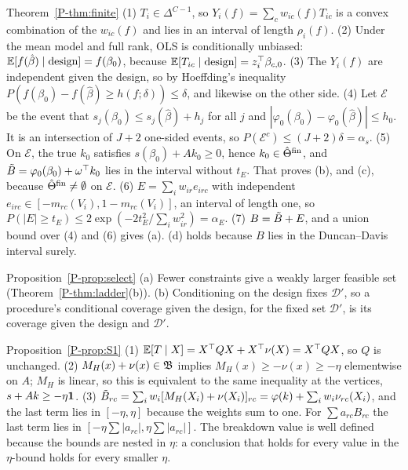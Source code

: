 \begin{proofof}{Theorem~\ref{P-thm:finite}}
(1) $T_i\in\Delta^{C-1}$, so $Y_i(f)=\sum_cw_{ic}(f)T_{ic}$ is a convex combination of the
$w_{ic}(f)$ and lies in an interval of length $\rho_i(f)$.
(2) Under the mean model and full rank, OLS is conditionally unbiased:
$\mathbb E[f(\hat\beta)\mid\text{design}]=f(\beta_0)$, because $\mathbb E[T_{ic}\mid\text{design}]=z_i^\top\beta_{c,0}$.
(3) The $Y_i(f)$ are independent given the design, so by Hoeffding's inequality
$P(f(\beta_0)-f(\hat\beta)\ge h(f;\delta))\le\delta$, and likewise on the other side.
(4) Let $\mathcal E$ be the event that $s_j(\beta_0)\le s_j(\hat\beta)+h_j$ for all $j$ and
$|\varphi_0(\beta_0)-\varphi_0(\hat\beta)|\le h_0$. It is an intersection of $J+2$ one-sided
events, so $P(\mathcal E^c)\le(J+2)\delta=\alpha_s$.
(5) On $\mathcal E$, the true $k_0$ satisfies $s(\beta_0)+Ak_0\ge0$, hence
$k_0\in\hat\Theta^{\rm fin}$, and $\tilde B=\varphi_0(\beta_0)+\omega^\top k_0$ lies in the interval
without $t_E$. That proves (b), and (c), because $\hat\Theta^{\rm fin}\ne\emptyset$ on
$\mathcal E$.
(6) $E=\sum_iw_{ir}e_{irc}$ with independent $e_{irc}\in[-m_{rc}(V_i),1-m_{rc}(V_i)]$, an
interval of length one, so $P(|E|\ge t_E)\le2\exp(-2t_E^2/\sum_iw_{ir}^2)=\alpha_E$.
(7) $B=\tilde B+E$, and a union bound over (4) and (6) gives (a). (d) holds because $B$ lies
in the Duncan--Davis interval surely.
\end{proofof}

\begin{proofof}{Proposition~\ref{P-prop:select}}
(a) Fewer constraints give a weakly larger feasible set (Theorem~\ref{P-thm:ladder}(b)).
(b) Conditioning on the design fixes $\mathcal D'$, so a procedure's conditional coverage
given the design, for the fixed set $\mathcal D'$, is its coverage given the design and
$\mathcal D'$.
\end{proofof}

\begin{proofof}{Proposition~\ref{P-prop:S1}}
(1) $\mathbb E[T\mid X]=X^\top QX+X^\top\nu(X)=X^\top QX$, so $Q$ is unchanged.
(2) $M_H(x)+\nu(x)\in\mathfrak B$ implies $M_H(x)\ge-\nu(x)\ge-\eta$ elementwise on $A$; $M_H$
is linear, so this is equivalent to the same inequality at the vertices,
$s+Ak\ge-\eta\mathbf 1$.
(3) $\tilde B_{rc}=\sum_iw_i[M_H(X_i)+\nu(X_i)]_{rc}=\varphi(k)+\sum_iw_i\nu_{rc}(X_i)$, and the last
term lies in $[-\eta,\eta]$ because the weights sum to one. For $\sum a_{rc}B_{rc}$ the
last term lies in $[-\eta\sum|a_{rc}|,\eta\sum|a_{rc}|]$.
The breakdown value is well defined because the bounds are nested in $\eta$: a
conclusion that holds for every value in the $\eta$-bound holds for every smaller $\eta$.
\end{proofof}

